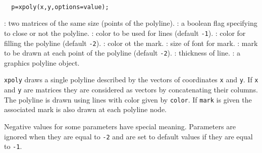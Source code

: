 \begin{mandesc}
  \\
\end{mandesc}
\begin{calling_sequence}
\begin{verbatim}
  p=xpoly(x,y,options=value);
\end{verbatim}
\end{calling_sequence}
\begin{parameters}
  \begin{varlist}
    : two matrices of the same size (points of the polyline).
    : a boolean flag specifying to close or not the polyline.
    : color to be used for lines (default \verb!-1!).
    : color for filling the polyline (default \verb!-2!).
    : color ot the mark.
    : size of font for mark.
    : mark to be drawn at each point of the polyline (default \verb!-2!).
    : thickness of line.
    : a graphics polyline object.
  \end{varlist}
\end{parameters}
\begin{mandescription}
  \verb!xpoly! draws a single polyline described by the vectors of
  coordinates \verb!x! and \verb!y!. If \verb!x! and
  \verb!y! are matrices they are considered as vectors by
  concatenating their columns. The polyline is drawn using
  lines with color given by \verb!color!. If \verb!mark! is
  given the associated mark is also drawn at each polyline node.

  Negative values for some parameters have special meaning.
  Parameters are ignored when they are equal to \verb!-2!
  and are set to default values if they are equal to \verb!-1!.
\end{mandescription}
